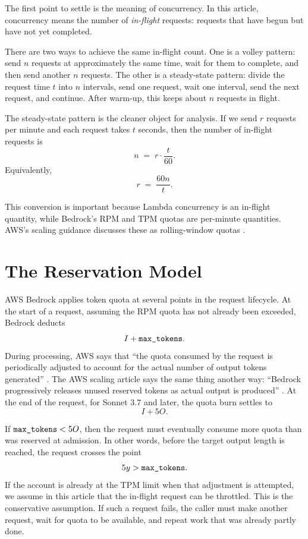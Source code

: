\documentclass[12pt]{extarticle}
\newcommand{\maxtok}{\text{\texttt{max\_tokens}}}
\newcommand{\inputtokens}{I}
\newcommand{\outputtokens}{O}
\begin{document}
The first point to settle is the meaning of concurrency. In this article, concurrency means the number of \emph{in-flight} requests: requests that have begun but have not yet completed.

There are two ways to achieve the same in-flight count. One is a volley pattern: send $n$ requests at approximately the same time, wait for them to complete, and then send another $n$ requests. The other is a steady-state pattern: divide the request time $t$ into $n$ intervals, send one request, wait one interval, send the next request, and continue. After warm-up, this keeps about $n$ requests in flight.

The steady-state pattern is the cleaner object for analysis. If we send $r$ requests per minute and each request takes $t$ seconds, then the number of in-flight requests is
\[
n \;=\; r \cdot \frac{t}{60}.
\]
Equivalently,
\[
r \;=\; \frac{60n}{t}.
\]

This conversion is important because Lambda concurrency is an in-flight quantity, while Bedrock's RPM and TPM quotas are per-minute quantities. AWS's scaling guidance discusses these as rolling-window quotas \cite{bedrock-scale}.

\section{The Reservation Model}

AWS Bedrock applies token quota at several points in the request lifecycle. At the start of a request, assuming the RPM quota has not already been exceeded, Bedrock deducts
\[
\inputtokens + \maxtok.
\]
During processing, AWS says that ``the quota consumed by the request is periodically adjusted to account for the actual number of output tokens generated'' \cite{bedrock-burndown}. The AWS scaling article says the same thing another way: ``Bedrock progressively releases unused reserved tokens as actual output is produced'' \cite{bedrock-scale}. At the end of the request, for Sonnet 3.7 and later, the quota burn settles to
\[
\inputtokens + 5\outputtokens.
\]

If $\maxtok < 5\outputtokens$, then the request must eventually consume more quota than was reserved at admission. In other words, before the target output length is reached, the request crosses the point
\[
5y > \maxtok.
\]
If the account is already at the TPM limit when that adjustment is attempted, we assume in this article that the in-flight request can be throttled. This is the conservative assumption. If such a request fails, the caller must make another request, wait for quota to be available, and repeat work that was already partly done.
\end{document}
